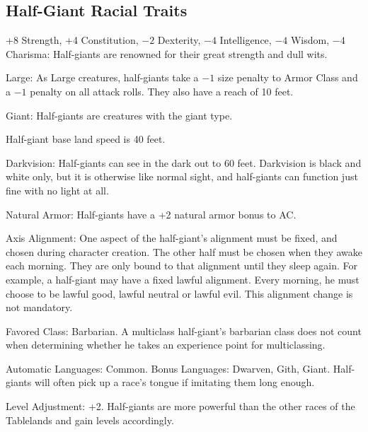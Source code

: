 \subsection{Half-Giant Racial Traits}
\begin{itemize*}
    \item +8 Strength, +4 Constitution, $-2$ Dexterity, $-4$ Intelligence, $-4$ Wisdom, $-4$ Charisma: Half-giants are renowned for their great strength and dull wits.
    \item Large: As Large creatures, half-giants take a $-1$ size penalty to Armor Class and a $-1$ penalty on all attack rolls. They also have a reach of 10 feet.
    \item Giant: Half-giants are creatures with the giant type.
    \item Half-giant base land speed is 40 feet.
    \item Darkvision: Half-giants can see in the dark out to 60 feet. Darkvision is black and white only, but it is otherwise like normal sight, and half-giants can function just fine with no light at all.
    \item Natural Armor: Half-giants have a +2 natural armor bonus to AC.
    \item Axis Alignment: One aspect of the half-giant's alignment must be fixed, and chosen during character creation. The other half must be chosen when they awake each morning. They are only bound to that alignment until they sleep again. For example, a half-giant may have a fixed lawful alignment. Every morning, he must choose to be lawful good, lawful neutral or lawful evil. This alignment change is not mandatory.
    \item Favored Class: Barbarian. A multiclass half-giant's barbarian class does not count when determining whether he takes an experience point for multiclassing.
    \item Automatic Languages: Common. Bonus Languages: Dwarven, Gith, Giant. Half-giants will often pick up a race's tongue if imitating them long enough.
    \item Level Adjustment: +2. Half-giants are more powerful than the other races of the Tablelands and gain levels accordingly.
\end{itemize*}